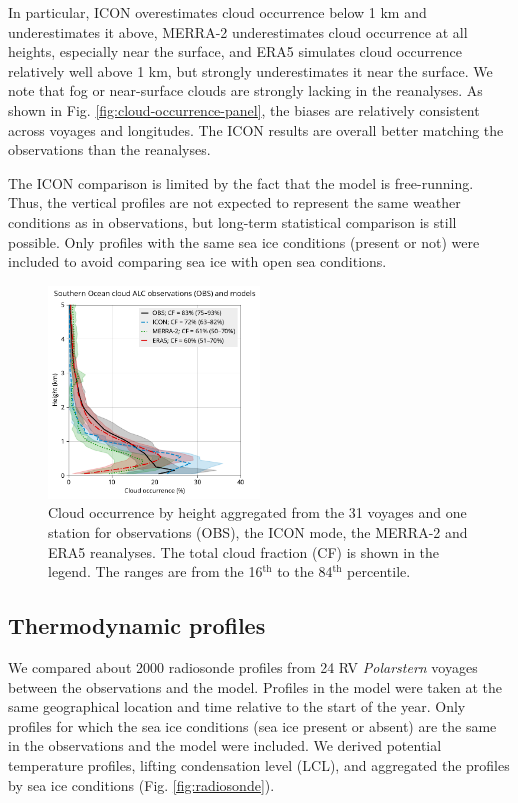 \documentclass[12pt,a4paper]{article}
\begin{document}
In particular, ICON overestimates cloud occurrence below 1 km and
underestimates it above, MERRA-2 underestimates cloud occurrence at all heights,
especially near the surface, and ERA5 simulates cloud occurrence relatively well
above 1 km, but strongly underestimates it near the surface.
We note that fog or near-surface clouds are strongly lacking in the reanalyses.
As shown in Fig. \ref{fig:cloud-occurrence-panel}, the biases are relatively
consistent across voyages and longitudes. The ICON results are overall better
matching the observations than the reanalyses.

The ICON comparison is limited by the fact that the model is free-running.
Thus, the vertical proﬁles are not expected to represent the same weather
conditions as in observations, but long-term statistical comparison is still
possible. Only proﬁles with the same sea ice conditions (present or not) were
included to avoid comparing sea ice with open sea conditions.

\begin{figure}
\centering
\includegraphics[width=0.5\textwidth]{img/cloud_occurrence.pdf}
\caption{Cloud occurrence by height aggregated from the 31 voyages and one station
for observations (OBS), the ICON mode, the MERRA-2 and ERA5 reanalyses. The
total cloud fraction (CF) is shown in the legend. The ranges are from the
16$^\mathrm{th}$ to the 84$^\mathrm{th}$ percentile.}
\label{fig:cloud-occurrence}
\end{figure}

\subsection{Thermodynamic proﬁles}

We compared about 2000 radiosonde proﬁles from 24 RV \emph{Polarstern}
voyages between the observations and the model. Proﬁles in the model were taken
at the same geographical location and time relative to the start of the year.
Only proﬁles for which the sea ice conditions (sea ice present or absent) are
the same in the observations and the model were included. We derived potential
temperature profiles, lifting condensation level (LCL), and aggregated the
profiles by sea ice conditions (Fig. \ref{fig:radiosonde}).
\end{document}
